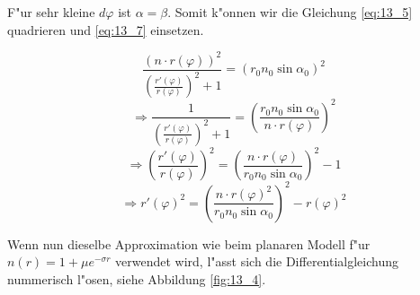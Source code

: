 F"ur sehr kleine $d\varphi$ ist $\alpha = \beta$. Somit k"onnen wir die Gleichung
\ref{eq:13_5} quadrieren und \ref{eq:13_7} einsetzen. 

$$\frac{(n \cdot r(\varphi))^2}{\left( \frac{r'(\varphi)}{r(\varphi)} \right)^2 +1} =
(r_0 n_0 \sin \alpha_0)^2$$
$$\Rightarrow \frac{1}{\left(\frac{r'(\varphi)}{r(\varphi)}\right)^2+1} =
\left(\frac{r_0 n_0 \sin\alpha_0}{n \cdot r(\varphi)}\right)^2$$
$$\Rightarrow \left(\frac{r'(\varphi)}{r(\varphi)}\right)^2 = \left(\frac{n \cdot
r(\varphi)}{r_0 n_0 \sin\alpha_0}\right)^2 - 1$$
\begin{equation}
\Rightarrow r'(\varphi)^2 = \left(\frac{n \cdot r(\varphi)^2}{r_0 n_0 \sin
\alpha_0}\right)^2 - r(\varphi)^2
\end{equation}

Wenn nun dieselbe Approximation wie beim planaren Modell f"ur $n(r)=1 + \mu e^{-\sigma r}$
verwendet wird, l"asst sich die Differentialgleichung nummerisch l"osen, siehe Abbildung
\ref{fig:13_4}.

